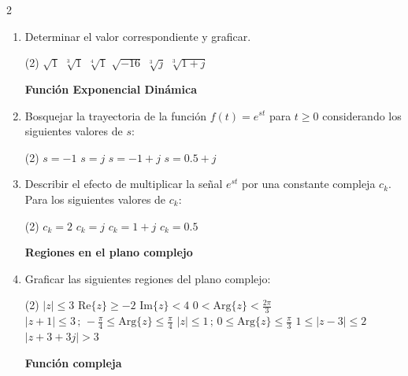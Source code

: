 \documentclass[10pt,a4paper]{article}
\begin{document}
\begin{multicols}{2}
\begin{enumerate}
			\textbf{Raíz enésima de un número complejo}
			\item {Determinar el valor correspondiente y graficar.}
			\begin{tasks}(2)
				\task $\sqrt{1}$
				\task $\sqrt[3]{1}$
				\task $\sqrt[4]{1}$
				\task $\sqrt{-16}$
				\task $\sqrt[3]{j}$
				\task $\sqrt[3]{1+j}$
			\end{tasks}
			
			\textbf{Función Exponencial Dinámica}

			\item {Bosquejar la trayectoria de la función $f(t) = e^{st}$ para $t \ge 0$ considerando los siguientes valores de $s$:}
			\begin{tasks}(2)
				\task $s = -1$
				\task $s = j$
				\task $s = -1+j$
				\task $s = 0.5+j$
			\end{tasks}

			\item {Describir el efecto de multiplicar la señal $e^{st}$ por una constante compleja $c_k$. Para los siguientes valores de $c_k$:}
			\begin{tasks}(2)
				\task $c_k = 2$
				\task $c_k = j$
				\task $c_k = 1+j$
				\task $c_k = 0.5$
			\end{tasks}

			\textbf{Regiones en el plano complejo}
			\item {Graficar las siguientes regiones del plano complejo:}
			\begin{tasks}(2)
				\task $|z| \leq 3$
				\task $\mathrm{Re}\{z\} \geq -2$
				\task $\mathrm{Im}\{z\} < 4$
				\task $0 < \mathrm{Arg}\{z\} < \frac{2\pi}{3}$
				\task $|z+1| \leq 3 \,;\, -\frac{\pi}{4} \leq \mathrm{Arg}\{z\} \leq \frac{\pi}{4}$
				\task $|z| \leq 1 \,;\, 0 \leq \mathrm{Arg}\{z\} \leq \frac{\pi}{3}$
				\task $1 \leq |z-3| \leq 2$
				\task $|z+3+3j| > 3$
			\end{tasks}
			
			\vspace{0.3cm}
			\textbf{Función compleja}
			

\end{enumerate}
\end{multicols}
\end{document}
